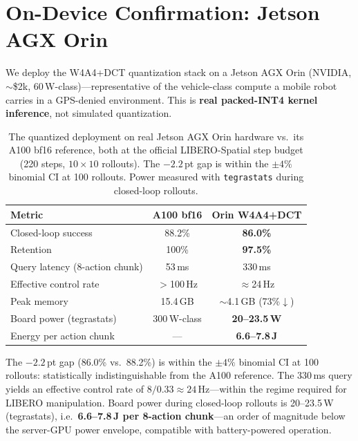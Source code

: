 \documentclass[conference]{IEEEtran}
\begin{document}
\section{On-Device Confirmation: Jetson AGX Orin}
\label{sec:device}

We deploy the W4A4+DCT quantization stack on a Jetson AGX Orin (NVIDIA, $\sim$\$2k,
60\,W-class)---representative of the vehicle-class compute a mobile robot carries in a
GPS-denied environment. This is \textbf{real packed-INT4 kernel inference}, not simulated
quantization.

\begin{table}[t]\centering\small
\caption{The quantized deployment on real Jetson AGX Orin hardware vs.\ its A100 bf16
reference, both at the official LIBERO-Spatial step budget (220 steps, $10\times10$
rollouts). The $-2.2$\,pt gap is within the $\pm4\%$ binomial CI at 100 rollouts. Power
measured with \texttt{tegrastats} during closed-loop rollouts.}
\label{tab:orin}
\begin{tabular}{lcc}
\toprule
Metric & A100 bf16 & Orin W4A4+DCT \\
\midrule
Closed-loop success & 88.2\% & \textbf{86.0\%} \\
Retention & 100\% & \textbf{97.5\%} \\
Query latency (8-action chunk) & 53\,ms & 330\,ms \\
Effective control rate & $>$100\,Hz & $\approx$24\,Hz \\
Peak memory & 15.4\,GB & $\sim$4.1\,GB (73\%$\downarrow$) \\
Board power (tegrastats) & 300\,W-class & \textbf{20--23.5\,W} \\
Energy per action chunk & --- & \textbf{6.6--7.8\,J} \\
\bottomrule
\end{tabular}
\end{table}

The $-2.2$\,pt gap (86.0\% vs.\ 88.2\%) is within the $\pm4\%$ binomial CI at 100 rollouts:
statistically indistinguishable from the A100 reference. The 330\,ms query yields an
effective control rate of $8/0.33 \approx 24$\,Hz---within the regime required for LIBERO
manipulation. Board power during closed-loop rollouts is 20--23.5\,W (tegrastats),
i.e.\ \textbf{6.6--7.8\,J per 8-action chunk}---an order of magnitude below the
server-GPU power envelope, compatible with battery-powered operation.
\end{document}
